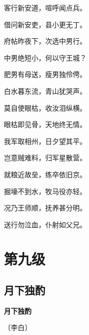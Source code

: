 \documentclass[12pt,UTF-8,openany,fontset=none]{ctexbook}
\begin{document}
\begin{center}
    \begin{Large}

        客行新安道，喧呼闻点兵。

        借问新安吏，县小更无丁。

        府帖昨夜下，次选中男行。

        中男绝短小，何以守王城？

        肥男有母送，瘦男独伶俜。

        白水暮东流，青山犹哭声。

        莫自使眼枯，收汝泪纵横。

        眼枯即见骨，天地终无情。

        我军取相州，日夕望其平。

        岂意贼难料，归军星散营。

        就粮近故垒，练卒依旧京。

        掘壕不到水，牧马役亦轻。

        况乃王师顺，抚养甚分明。

        送行勿泣血，仆射如父兄。

    \end{Large}

\end{center}

\vspace{8pt}
\clearpage

\chapter{第九级}
\clearpage

\section{月下独酌}


\begin{center}
    {\bfseries 月下独酌}

    \vspace{18pt}

    \begin{large}\xuwen
        〔李白〕
    \end{large}

\end{center}

    \vspace{18pt}
\end{document}
